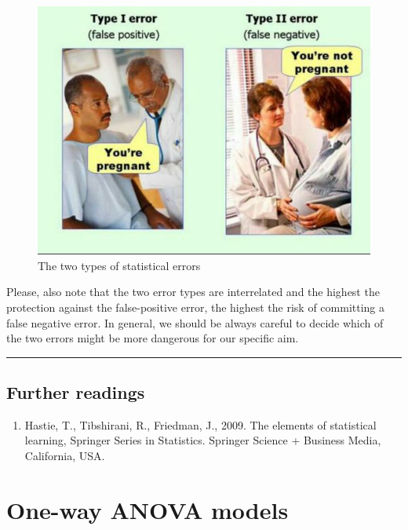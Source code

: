 \documentclass[a4paper,12pt,oneside]{book}
\providecommand{\tightlist}{%
  \setlength{\itemsep}{0pt}\setlength{\parskip}{0pt}}
\begin{document}
\begin{figure}

{\centering \includegraphics[width=0.85\linewidth]{_images/statisticalErrors} 

}

\caption{The two types of statistical errors}\label{fig:figName72}
\end{figure}

Please, also note that the two error types are interrelated and the highest the protection against the false-positive error, the highest the risk of committing a false negative error. In general, we should be always careful to decide which of the two errors might be more dangerous for our specific aim.

\begin{center}\rule{0.5\linewidth}{0.5pt}\end{center}

\hypertarget{further-readings-4}{%
\section{Further readings}\label{further-readings-4}}

\begin{enumerate}
\def\labelenumi{\arabic{enumi}.}
\tightlist
\item
  Hastie, T., Tibshirani, R., Friedman, J., 2009. The elements of statistical learning, Springer Series in Statistics. Springer Science + Business Media, California, USA.
\end{enumerate}

\hypertarget{one-way-anova-models}{%
\chapter{One-way ANOVA models}\label{one-way-anova-models}}
\end{document}
